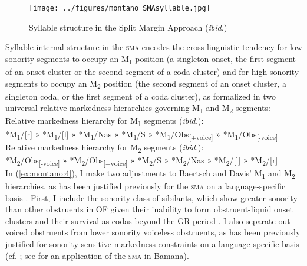 \documentclass[output=paper,colorlinks,citecolor=brown,
]{langscibook}
\begin{document}
\begin{figure}
    \texttt{[image: ../figures/montano\_SMAsyllable.jpg]} %
    \caption{Syllable structure in the Split Margin Approach (\textit{ibid.})}
    \label{fig:montano:SMAsyllable}
\end{figure}

\noindent Syllable-internal structure in the \textsc{sma} encodes the cross-linguistic tendency for low sonority segments to occupy an M\textsubscript{1} position (a singleton onset, the first segment of an onset cluster or the second segment of a coda cluster) and for high sonority segments to occupy an M\textsubscript{2} position (the second segment of an onset cluster, a singleton coda, or the first segment of a coda cluster), as formalized in two universal relative markedness hierarchies governing M\textsubscript{1} and M\textsubscript{2} segments:
\ea \label{ex:montano:4} 
\ea Relative markedness hierarchy for M\textsubscript{1} segments (\textit{ibid.}):\\
	*M\textsubscript{1}/[r] » *M\textsubscript{1}/[l] » *M\textsubscript{1}/Nas » *M\textsubscript{1}/S » *M\textsubscript{1}/Obs\textsubscript{[+voice]} » *M\textsubscript{1}/Obs\textsubscript{[-voice]}\\
\ex Relative markedness hierarchy for M\textsubscript{2} segments (\textit{ibid.}):\\
		*M\textsubscript{2}/Obs\textsubscript{[-voice]} » *M\textsubscript{2}/Obs\textsubscript{[+voice]} » *M\textsubscript{2}/S » *M\textsubscript{2}/Nas » *M\textsubscript{2}/[l] » *M\textsubscript{2}/[r]\\
\z\z
\noindent In (\ref{ex:montano:4}), I make two adjustments to Baertsch and Davis' M\textsubscript{1} and M\textsubscript{2} hierarchies, as has been justified previously for the \textsc{sma} on a language-specific basis \citep{BaertschDavis2009}.  First, I include the sonority class of sibilants, which show greater sonority than other obstruents in OF given their inability to form obstruent-liquid onset clusters and their survival as codas beyond the GR period \citep{Pope1952, Gess1999}.  I also separate out voiced obstruents from lower sonority voiceless obstruents, as has been previously justified for sonority-sensitive markedness constraints on a language-specific basis (cf. \citet{Gouskova2004, PonsMoll2011}; see \citet{GreenBaertsch2014} for an application of the \textsc{sma} in Bamana).
\end{document}
